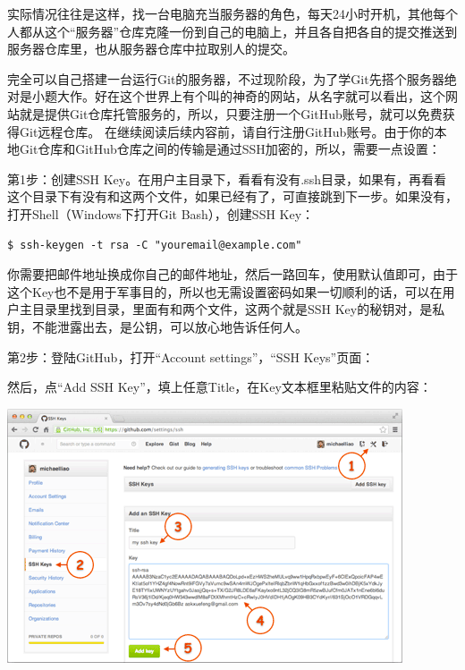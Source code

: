 \documentclass[•]{article}
\begin{document}
\begin{CJK}{UTF8}{gbsn}
\qquad 实际情况往往是这样，找一台电脑充当服务器的角色，每天24小时开机，其他每个人都从这个“服务器”仓库克隆一份到自己的电脑上，并且各自把各自的提交推送到服务器仓库里，也从服务器仓库中拉取别人的提交。

\qquad 完全可以自己搭建一台运行Git的服务器，不过现阶段，为了学Git先搭个服务器绝对是小题大作。好在这个世界上有个叫{\color{blue}{GitHub}}的神奇的网站，从名字就可以看出，这个网站就是提供Git仓库托管服务的，所以，只要注册一个GitHub账号，就可以免费获得Git远程仓库。
\qquad 在继续阅读后续内容前，请自行注册GitHub账号。由于你的本地Git仓库和GitHub仓库之间的传输是通过SSH加密的，所以，需要一点设置：

第1步：创建SSH Key。在用户主目录下，看看有没有.ssh目录，如果有，再看看这个目录下有没有\fbox{\color{red}{id-rsa}}和\fbox{\color{red}{id——rsa.pub}}这两个文件，如果已经有了，可直接跳到下一步。如果没有，打开Shell（Windows下打开Git Bash），创建SSH Key：

\begin{lstlisting} 
$ ssh-keygen -t rsa -C "youremail@example.com"
\end{lstlisting}

\qquad 你需要把邮件地址换成你自己的邮件地址，然后一路回车，使用默认值即可，由于这个Key也不是用于军事目的，所以也无需设置密码如果一切顺利的话，可以在用户主目录里找到\fbox{\color{red}{.ssh}}目录，里面有\fbox{\color{red}{id-rsa}}和\fbox{\color{red}{id-rsa.pub}}两个文件，这两个就是SSH Key的秘钥对，\fbox{\color{red}{id-rsa}}是私钥，不能泄露出去，\fbox{\color{red}{id-rsa.pub}}是公钥，可以放心地告诉任何人。

\qquad 第2步：登陆GitHub，打开“Account settings”，“SSH Keys”页面：

然后，点“Add SSH Key”，填上任意Title，在Key文本框里粘贴\fbox{\color{red}{id-rsa.pub}}文件的内容：

\begin{center}
\includegraphics[scale=0.6]{add_ssh_key.png}
\end{center}


\end{CJK}
\end{document}
